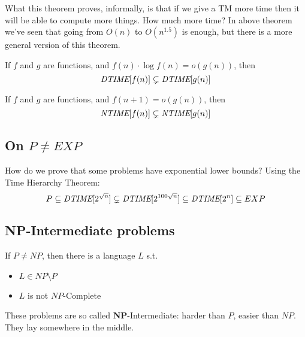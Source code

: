     What this theorem proves, informally, is that if we give a TM more time then it will be able to compute more things.
    How much more time? In above theorem we've seen that going from $O(n)$ to $O(n^{1.5})$ is enough, but there is a more general version of this theorem.

    \begin{theorem}\label{thm:general_time_hierarchy}
        If $f$ and $g$ are  functions, and $f(n) \cdot \log f(n) = o(g(n))$, then
        \[ \textit{DTIME}[f(n)] \subsetneq \textit{DTIME}[g(n)] \]
    \end{theorem}

    \begin{theorem}\label{thm:time_hierarchy_ntime}
        If $f$ and $g$ are  functions, and $f(n+1) = o(g(n))$, then
        \[ \textit{NTIME}[f(n)] \subsetneq \textit{NTIME}[g(n)] \]
    \end{theorem}

\subsection{On $P \neq EXP$}\label{subsec:p_vs_exp}
    How do we prove that some problems have exponential lower bounds?
    Using the Time Hierarchy Theorem:
    \[ P \subseteq \textit{DTIME}[2^{\sqrt{n}}] \subsetneq \textit{DTIME}[2^{100 \sqrt{n}}] \subseteq \textit{DTIME}[2^n] \subseteq EXP \]


\subsection{\textbf{NP}-Intermediate problems}\label{subsec:ladner}
    \begin{theorem}[Ladner]\label{thm:ladner}
        If $P \neq NP$, then there is a language $L$ s.t.
        \begin{itemize}
            \item $L \in NP \setminus P$
            \item $L$ is not $NP$-Complete
        \end{itemize}
    \end{theorem}

    These problems are so called \textbf{NP}-Intermediate: harder than $P$, easier than $NP$. They lay somewhere in the middle.